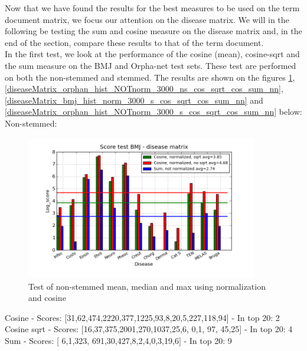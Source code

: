 Now that we have found the results for the best measures to be used on the term document matrix, we focus our attention on the disease matrix. We will in the following be testing the sum and cosine measure on the disease matrix and, in the end of the section, compare these results to that of the term document. \\

In the first test, we look at the performance of the cosine (mean), cosine-sqrt and the sum measure on the BMJ and Orpha-net test sets. These test are performed on both the non-stemmed and stemmed. The results are shown on the figures \ref{diseaseMatrix_bmj_hist_norm_3000_ns_cos_sqrt_cos_sum_nn}, \ref{diseaseMatrix_orphan_hist_NOTnorm_3000_ns_cos_sqrt_cos_sum_nn}, \ref{diseaseMatrix_bmj_hist_norm_3000_s_cos_sqrt_cos_sum_nn} and \ref{diseaseMatrix_orphan_hist_NOTnorm_3000_s_cos_sqrt_cos_sum_nn} below: \\

Non-stemmed:

\begin{figure}[h!]
        \begin{center}
          \includegraphics[width=0.9\textwidth]{barcharts/diseaseMatrix_bmj_hist_norm_3000_ns_cos_sqrt_cos_sum_nn.png}
        \end{center}
        \caption{Test of non-stemmed mean, median and max using normalization and cosine}
        \label{diseaseMatrix_bmj_hist_norm_3000_ns_cos_sqrt_cos_sum_nn}
\end{figure}
 
Cosine - Scores: [31,62,474,2220,377,1225,93,8,20,5,227,118,94] - In top 20: 2 \\
Cosine sqrt - Scores: [16,37,375,2001,270,1037,25,6, 0,1, 97, 45,25] - In top 20: 4 \\
Sum - Scores: [ 6,1,323, 691,30,427,8,2,4,0,3,19,6] - In top 20: 9 \\

